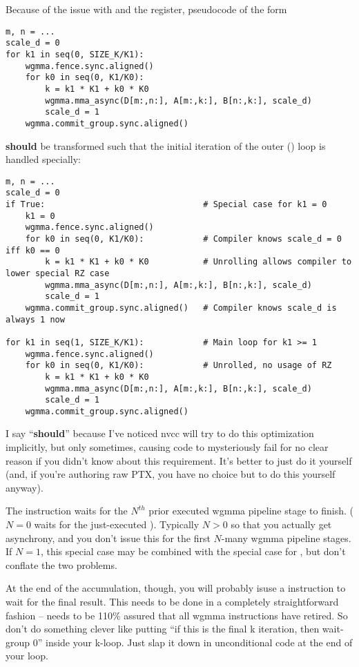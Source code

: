 Because of the issue with  and the  register, pseudocode of the form
{\color{lightttColor}
\begin{verbatim}
m, n = ...
scale_d = 0
for k1 in seq(0, SIZE_K/K1):
    wgmma.fence.sync.aligned()
    for k0 in seq(0, K1/K0):
        k = k1 * K1 + k0 * K0
        wgmma.mma_async(D[m:,n:], A[m:,k:], B[n:,k:], scale_d)
        scale_d = 1
    wgmma.commit_group.sync.aligned()
\end{verbatim}
}
\textbf{should} be transformed such that the initial iteration of the outer () loop is handled specially:
{\color{lightttColor}
\begin{verbatim}
m, n = ...
scale_d = 0
if True:                                # Special case for k1 = 0
    k1 = 0
    wgmma.fence.sync.aligned()
    for k0 in seq(0, K1/K0):            # Compiler knows scale_d = 0 iff k0 == 0
        k = k1 * K1 + k0 * K0           # Unrolling allows compiler to lower special RZ case
        wgmma.mma_async(D[m:,n:], A[m:,k:], B[n:,k:], scale_d)
        scale_d = 1
    wgmma.commit_group.sync.aligned()   # Compiler knows scale_d is always 1 now

for k1 in seq(1, SIZE_K/K1):            # Main loop for k1 >= 1
    wgmma.fence.sync.aligned()
    for k0 in seq(0, K1/K0):            # Unrolled, no usage of RZ
        k = k1 * K1 + k0 * K0
        wgmma.mma_async(D[m:,n:], A[m:,k:], B[n:,k:], scale_d)
        scale_d = 1
    wgmma.commit_group.sync.aligned()
\end{verbatim}
}

I say ``\textbf{should}'' because I've noticed nvcc will try to do this optimization implicitly, but only sometimes, causing code to mysteriously fail for no clear reason if you didn't know about this requirement.
It's better to just do it yourself (and, if you're authoring raw PTX, you have no choice but to do this yourself anyway).

\filbreak
{}

The  instruction waits for the $N^{th}$ prior executed wgmma pipeline stage to finish.
($N = 0$ waits for the just-executed ).
Typically $N > 0$ so that you actually get asynchrony, and you don't issue this for the first $N$-many wgmma pipeline stages.
If $N = 1$, this special case may be combined with the special case for , but don't conflate the two problems.

\filbreak
At the end of the accumulation, though, you will probably isuse a  instruction to wait for the final result.
This needs to be done in a completely straightforward fashion --  needs to be 110\% assured that all wgmma instructions have retired.
So don't do something clever like putting ``if this is the final k iteration, then wait-group 0'' inside your k-loop.
Just slap it down in unconditional code at the end of your loop.


